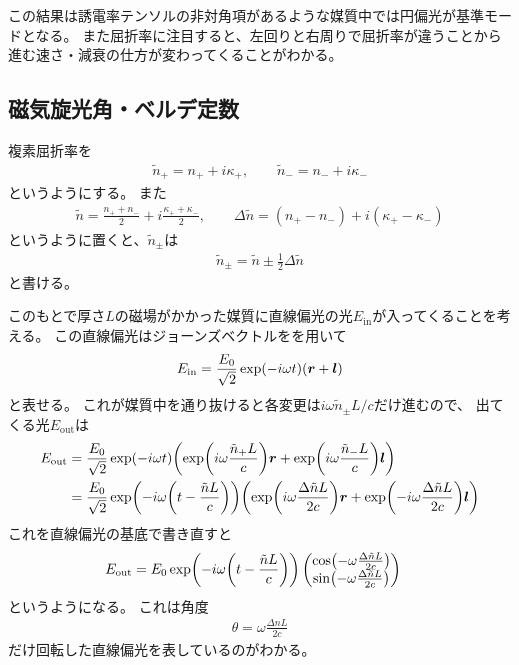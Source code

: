 \documentclass[9pt,dvipdfmx,a4paper]{jsarticle}
\begin{document}
この結果は誘電率テンソルの非対角項があるような媒質中では円偏光が基準モードとなる。
また屈折率に注目すると、左回りと右周りで屈折率が違うことから進む速さ・減衰の仕方が変わってくることがわかる。

\subsection{磁気旋光角・ベルデ定数}
複素屈折率を
\begin{align}
    \tilde{n}_{+} = n_+ +i\kappa_+,\qquad \tilde{n}_{-} = n_- +i\kappa_-
\end{align}
というようにする。
また
\begin{align}
    \tilde{n} = \frac{n_+ + n_-}{2} + i \frac{\kappa_+ + \kappa_-}{2} ,\qquad
    \Delta \tilde{n} = (n_+ -n_-) + i(\kappa_+ -\kappa_-)
\end{align}
というように置くと、\(\tilde{n}_{\pm}\)は
\begin{align}
    \tilde{n}_\pm = \tilde{n} \pm \frac{1}{2}\Delta\tilde{n}
\end{align}
と書ける。

このもとで厚さ\(L\)の磁場がかかった媒質に直線偏光の光\(E_{\text{in}}\)が入ってくることを考える。
この直線偏光はジョーンズベクトルをを用いて
\begin{align}
    E_{\text{in}} = \frac{E_0}{\sqrt{2}}\exp(-i\omega t)(\vb*{r}+\vb*{l})
\end{align}
と表せる。
これが媒質中を通り抜けると各変更は\(i\omega \tilde{n}_{\pm}L/c\)だけ進むので、
出てくる光\(E_{\text{out}}\)は
\begin{align}
    E_{\text{out}}
    &= \frac{E_0}{\sqrt{2}}\exp(-i\omega t) \qty(\exp(i\omega \frac{\tilde{n}_{+}L}{c})\vb*{r}
        +\exp(i\omega \frac{\tilde{n}_{-}L}{c})\vb*{l}) \notag\\
    &= \frac{E_0}{\sqrt{2}}\exp(-i\omega \qty(t-\frac{\tilde{n}L}{c}))
        \qty(\exp(i\omega \frac{\Delta\tilde{ n}L}{2c})\vb*{r}
            +\exp(-i\omega \frac{\Delta\tilde{n}L}{2c})\vb*{l})
\end{align}
これを直線偏光の基底で書き直すと
\begin{align}
    E_{\text{out}}
    &= E_0\exp(-i\omega \qty(t-\frac{\tilde{n}L}{c}))
    \begin{pmatrix}
       \cos(-\omega \frac{\Delta\tilde{n}L}{2c}) \\
       \sin(-\omega \frac{\Delta\tilde{n}L}{2c})
    \end{pmatrix}
\end{align}
というようになる。
これは角度
\begin{align*}
    \theta = \omega \frac{\Delta nL}{2c}
\end{align*}
だけ回転した直線偏光を表しているのがわかる。
\end{document}
